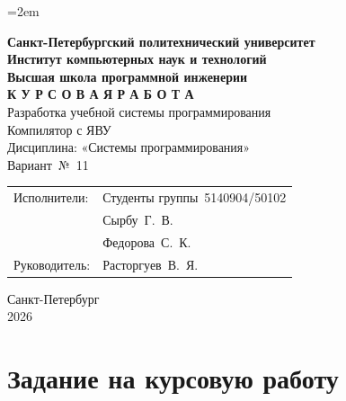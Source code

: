 \documentclass[a4paper,14pt]{extarticle}
\begin{document}
\sloppy
\emergencystretch=2em

\thispagestyle{empty}
\begin{center}
  \textbf{Санкт-Петербургский политехнический университет}\\
  \textbf{Институт компьютерных наук и технологий}\\
  \textbf{Высшая школа программной инженерии}\\[3cm]

  {\Large\textbf{К У Р С О В А Я \quad Р А Б О Т А}}\\[1cm]
  {\large Разработка учебной системы программирования}\\[0.5cm]
  {\large Компилятор с ЯВУ}\\[2cm]

  Дисциплина: «Системы программирования»\\[1cm]
  Вариант~№~11\\[2cm]
\end{center}

\begin{flushright}
  \begin{tabular}{ll}
    Исполнители: & Студенты группы~5140904/50102\\
                 & Сырбу~Г.~В.\\
                 & Федорова~С.~К.\\[0.5cm]
    Руководитель: & Расторгуев~В.~Я.\\
  \end{tabular}
\end{flushright}

\vfill
\begin{center}
  Санкт-Петербург\\
  2026
\end{center}

\newpage

\tableofcontents
\newpage

\section{Задание на курсовую работу}
\end{document}
